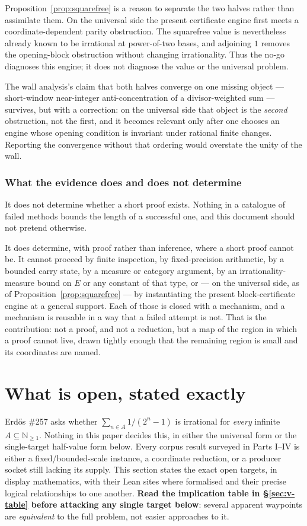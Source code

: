 \documentclass[11pt]{article}
\theoremstyle{plain}
\theoremstyle{definition}
\theoremstyle{remark}
\begin{document}
Proposition~\ref{prop:squarefree} is a reason to separate the two halves
rather than assimilate them.  On the universal side the present
certificate engine first meets a coordinate-dependent parity obstruction.
The squarefree value is nevertheless already known to be irrational at
power-of-two bases, and adjoining $1$ removes the opening-block obstruction
without changing irrationality.  Thus the no-go diagnoses this engine; it
does not diagnose the value or the universal problem.

The wall analysis's claim that both halves converge on one missing object --- short-window
near-integer anti-concentration of a divisor-weighted sum --- survives, but with a correction: on
the universal side that object is the \emph{second} obstruction, not the first, and it becomes
relevant only after one chooses an engine whose opening condition is
invariant under rational finite changes. Reporting the convergence without
that ordering would overstate the unity of the wall.

\subsubsection*{What the evidence does and does not determine}

It does not determine whether a short proof exists. Nothing in a catalogue of failed methods
bounds the length of a successful one, and this document should not pretend otherwise.

It does determine, with proof rather than inference, where a short proof cannot be. It cannot
proceed by finite inspection, by fixed-precision arithmetic, by a bounded carry state, by a
measure or category argument, by an irrationality-measure bound on $E$ or any constant of that
type, or --- on the universal side, as of Proposition~\ref{prop:squarefree} --- by instantiating
the present block-certificate engine at a general support. Each of those is closed with a
mechanism, and a mechanism is reusable in a way that a failed attempt is not. That is the
contribution: not a proof, and not a reduction, but a map of the region in which a proof cannot
live, drawn tightly enough that the remaining region is small and its coordinates are named.
\section{What is open, stated exactly}

Erd\H{o}s \#257 asks whether $\sum_{n\in A}1/(2^n-1)$ is irrational for \emph{every} infinite
$A\subseteq\mathbb{N}_{\ge 1}$. Nothing in this paper decides this, in either the universal form
or the single-target half-value form below. Every corpus result surveyed in Parts I--IV is either
a fixed/bounded-scale instance, a coordinate reduction, or a producer socket still lacking its
supply. This section states the exact open targets, in display mathematics, with their Lean sites
where formalised and their precise logical relationships to one another. \textbf{Read the
implication table in \S\ref{sec:v-table} before attacking any single target below}: several
apparent waypoints are \emph{equivalent} to the full problem, not easier approaches to it.
\end{document}
